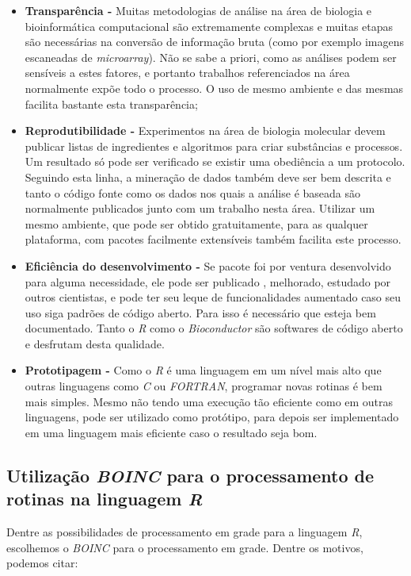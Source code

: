 \begin{itemize}
  \item \textbf{Transparência -} Muitas metodologias de análise na área de biologia e bioinformática computacional
são extremamente complexas e muitas etapas são necessárias na conversão de informação bruta (como por exemplo imagens 
escaneadas de \emph{microarray}). Não se sabe a priori, como as análises podem ser sensíveis a estes fatores, e portanto
trabalhos referenciados na área normalmente expõe todo o processo. O uso de mesmo ambiente e das mesmas facilita bastante
esta transparência;
  \item \textbf{Reprodutibilidade -} Experimentos na área de biologia molecular devem publicar listas de ingredientes
e algoritmos para criar substâncias e processos. Um resultado só pode ser verificado se existir uma obediência a 
um protocolo. Seguindo esta linha, a mineração de dados também deve ser bem descrita e tanto o código fonte 
como os dados nos quais a análise é baseada são normalmente publicados junto com um trabalho nesta área. Utilizar
um mesmo ambiente, que pode ser obtido gratuitamente, para as qualquer plataforma, com pacotes 
facilmente extensíveis também facilita este processo.
  \item \textbf{Eficiência do desenvolvimento -} Se pacote foi por ventura desenvolvido para alguma necessidade, ele pode ser publicado
, melhorado, estudado por outros cientistas, e pode ter seu leque de funcionalidades aumentado caso seu uso siga padrões
de código aberto. Para isso é necessário que esteja bem documentado. Tanto o \emph{R} como o \emph{Bioconductor} são softwares
de código aberto e desfrutam desta qualidade.
  \item \textbf{Prototipagem -} Como o \emph{R} é uma linguagem em um nível mais alto que outras linguagens como \emph{C} ou
\emph{FORTRAN}, programar novas rotinas é bem mais simples. Mesmo não tendo uma execução tão eficiente como em outras
linguagens, pode ser utilizado como protótipo, para depois ser implementado em uma linguagem mais eficiente caso o 
resultado seja bom. 

\end{itemize}

\subsection{Utilização \emph{BOINC} para o processamento de rotinas na linguagem \emph{R}}

Dentre as possibilidades de processamento em grade para a linguagem \emph{R}, escolhemos o \emph{BOINC} para o processamento em grade.
Dentre os motivos, podemos citar:

